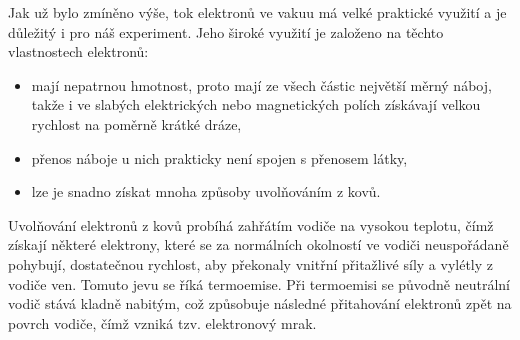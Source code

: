 Jak už bylo zmíněno výše, tok elektronů ve vakuu má velké praktické využití a je důležitý i pro náš experiment. Jeho široké využití je založeno na těchto vlastnostech elektronů:

\begin{itemize}
\item mají nepatrnou hmotnost, proto mají ze všech částic největší měrný náboj, takže i ve slabých elektrických nebo magnetických polích získávají velkou rychlost na poměrně krátké dráze,
\item přenos náboje u nich prakticky není spojen s přenosem látky,
\item lze je snadno získat mnoha způsoby uvolňováním z kovů.
\end{itemize}

Uvolňování elektronů z kovů probíhá zahřátím vodiče na vysokou teplotu, čímž získají některé elektrony, které se za normálních okolností ve vodiči neuspořádaně pohybují, dostatečnou rychlost, aby překonaly vnitřní přitažlivé síly a vylétly z vodiče ven. Tomuto jevu se říká termoemise. Při termoemisi se původně neutrální vodič stává kladně nabitým, což způsobuje následné přitahování elektronů zpět na povrch vodiče, čímž vzniká tzv. elektronový mrak. 

%

